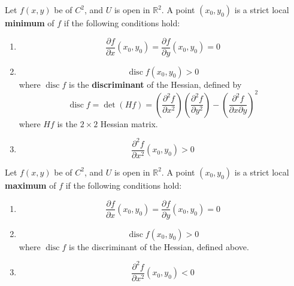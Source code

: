 \documentclass[openany]{book}
\newcommand{\R}{\mathbb{R}}
\DeclareMathOperator{\disc}{disc}
\begin{document}
\begin{prop}
    Let $f(x,y)$ be of $C^2$, and $U$ is open in $\R^2$. A point $(x_0,y_0)$ is a strict local \textbf{minimum} of $f$ if the following conditions hold:
    \begin{enumerate}
        \item \begin{equation*}
            \frac{\partial f}{\partial x}(x_0,y_0)=\frac{\partial f}{\partial y}(x_0,y_0)=0
        \end{equation*}
        \item \begin{equation*}
            \disc f(x_0,y_0)>0
        \end{equation*}
        where $\disc f$ is the \textbf{discriminant} of the Hessian, defined by 
        \begin{equation*}
            \disc f=\det (Hf)=\left(\frac{\partial^2 f}{\partial x^2}\right)\left(\frac{\partial^2 f}{\partial y^2}\right)-\left(\frac{\partial^2 f}{\partial x\partial y}\right)^2
        \end{equation*}
        where $Hf$ is the $2\times 2$ Hessian matrix.
        \item  \begin{equation*}
            \frac{\partial^2f}{\partial x^2}(x_0,y_0)>0
        \end{equation*}
    \end{enumerate}
\end{prop}


\begin{prop}
    Let $f(x,y)$ be of $C^2$, and $U$ is open in $\R^2$. A point $(x_0,y_0)$ is a strict local \textbf{maximum} of $f$ if the following conditions hold:
    \begin{enumerate}
        \item \begin{equation*}
            \frac{\partial f}{\partial x}(x_0,y_0)=\frac{\partial f}{\partial y}(x_0,y_0)=0
        \end{equation*}
        \item \begin{equation*}
            \disc f(x_0,y_0)>0
        \end{equation*}
        where $\disc f$ is the {discriminant} of the Hessian, defined above.
        \item  \begin{equation*}
            \frac{\partial^2f}{\partial x^2}(x_0,y_0)<0
        \end{equation*}
    \end{enumerate}
\end{prop}
\end{document}
